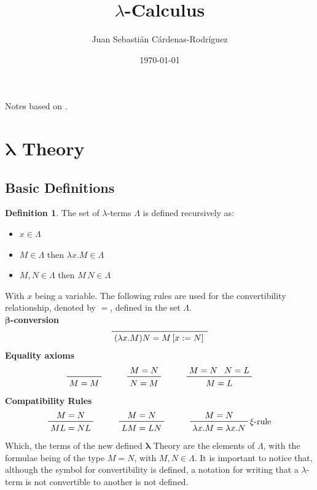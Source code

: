 \documentclass[11pt]{article}
\title{$\lambda$-Calculus}
\author{Juan Sebasti\'an C\'ardenas-Rodríguez \\
        \scalebox{0.7}{Mathematical Engineering, Universidad EAFIT}}
\date{\today}
\theoremstyle{definition}
\newtheorem{definition}{Definition}[section]
\theoremstyle{remark}
\theoremstyle{remark}
\theoremstyle{definition}
\begin{document}
\maketitle
Notes based on \parencite{barendregt2004}.

\section{$\pmb{\lambda}$ Theory}

\subsection{Basic Definitions}
\begin{definition}
  The set of $\lambda$-terms $\Lambda$ is defined recursively as:
  \begin{itemize}
    \item $x \in \Lambda$
    \item $M \in \Lambda$ then $\lambda x.M \in \Lambda$
    \item $M, N \in \Lambda$ then $M\,N \in \Lambda$
  \end{itemize}
\end{definition}

With $x$ being a variable. The following rules are used for the convertibility
relationship, denoted by $=$, defined in the set $\Lambda$. \\

\textbf{$\pmb{\beta}$-conversion}
%
\begin{equation*}
  \prftree{(\lambda x.M)N = M\left[x := N\right]}
\end{equation*}
%
\textbf{Equality axioms}
%
\begin{equation*}
  \begin{array}{ccc}
    \prftree{M = M} \qquad & \prftree{M = N}{N = M} \qquad
    & \prftree{M = N}{N = L}{M = L}
  \end{array}
\end{equation*}
%
\textbf{Compatibility Rules}
%
\begin{equation*}
  \begin{array}{ccc}
    \prftree{M = N}{ML = NL} \qquad & \prftree{M = N}{LM = LN} \qquad &
    \prftree[r]{$\xi$-rule}{M = N}{\lambda x.M = \lambda x.N}
  \end{array}
\end{equation*}
%
Which, the terms of the new defined $\pmb{\lambda}$ Theory are the elements of
$\Lambda$, with the formulae being of the type $M = N$, with $M, N \in \Lambda$.
It is important to notice that, although the symbol for convertibility is
defined, a notation for writing that a $\lambda$-term is not convertible to
another is not defined.
\end{document}
